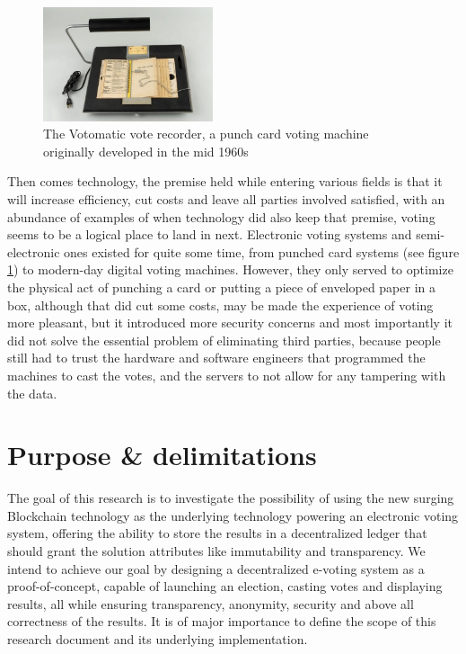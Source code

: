 \begin{figure}
	\vspace{-10pt}
	\includegraphics[width=5cm]{images/chapter1/votomatic.jpg}
	\vspace{-10pt}
	\caption{{\footnotesize The Votomatic vote recorder, a punch card voting machine originally developed in the mid 1960s}}
	\label{votomatic}
\end{figure}

Then comes technology, the premise held while entering various fields is that it will increase efficiency, cut costs and leave all parties involved satisfied, with an abundance of examples of when technology did also keep that premise, voting seems to be a logical place to land in next. Electronic voting systems and semi-electronic ones existed for quite some time, from punched card systems {\small (see figure \ref{votomatic})} to modern-day digital voting machines. However, they only served to optimize the physical act of punching a card or putting a piece of enveloped paper in a box, although that did cut some costs, may be made the experience of voting more pleasant, but it introduced more security concerns and most importantly it did not solve the essential problem of eliminating third parties, because people still had to trust the hardware and software engineers that programmed the machines to cast the votes, and the servers to not allow for any tampering with the data.\newpage


\section{Purpose \& delimitations}
The goal of this research is to investigate the possibility of using the new surging Blockchain technology as the underlying technology powering an electronic voting system, offering the ability to store the results in a decentralized ledger that should grant the solution attributes like immutability and transparency. We intend to achieve our goal by designing a decentralized e-voting system as a \gls{proof-of-concept}, capable of launching an election, casting votes and displaying results, all while ensuring transparency, anonymity, security and above all correctness of the results.
It is of major importance to define the scope of this research document and its underlying implementation.


